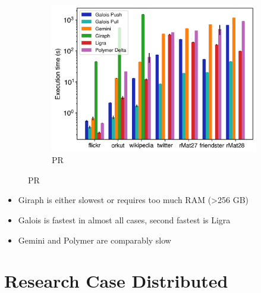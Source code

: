 \documentclass{meetings}
\begin{document}
\begin{figure}[h]
\begin{subfigure}{0.32\textwidth}
		\includegraphics[width=\linewidth]{../../plots/singleNodePR_execTime.png}
		\caption{PR}
		\label{fig:singleNodeSSSP_exec}
	\end{subfigure}
\end{figure}
\begin{itemize}
	\item Giraph is either slowest or requires too much RAM (>256 GB)
	\item Galois is fastest in almost all cases, second fastest is Ligra
	\item Gemini and Polymer are comparably slow
\end{itemize}


\section{Research Case Distributed}
\end{document}
